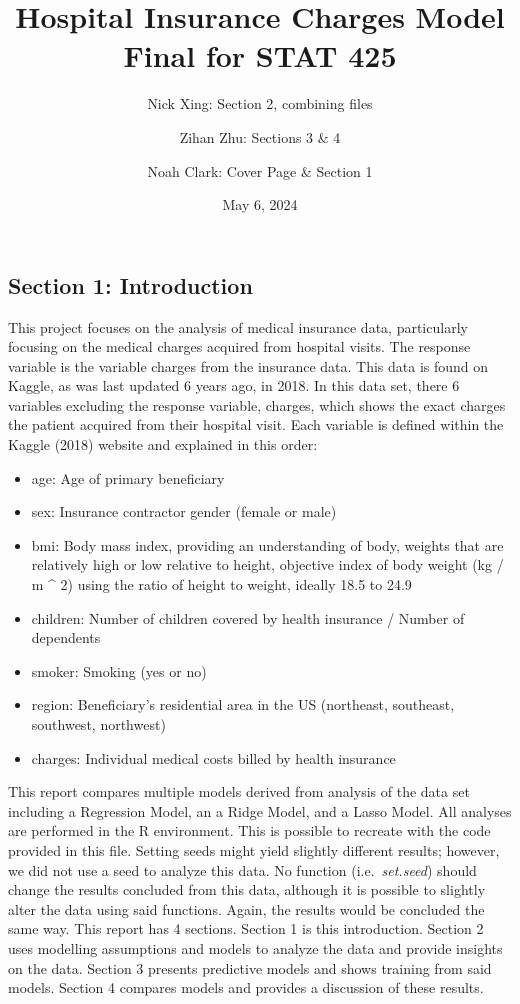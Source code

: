 \documentclass[
  12pt,
]{article}
\title{Hospital Insurance Charges Model \vspace{0.5cm}\\
Final for STAT 425}
\author{Nick Xing: Section 2, combining files \and Zihan Zhu: Sections 3
\& 4 \and Noah Clark: Cover Page \& Section 1}
\date{May 6, 2024}
\begin{document}
\maketitle

{
\setcounter{tocdepth}{3}
\tableofcontents
}
\newpage

\subsection{Section 1: Introduction}\label{section-1-introduction}

This project focuses on the analysis of medical insurance data,
particularly focusing on the medical charges acquired from hospital
visits. The response variable is the variable charges from the insurance
data. This data is found on Kaggle, as was last updated 6 years ago, in
2018. In this data set, there 6 variables excluding the response
variable, charges, which shows the exact charges the patient acquired
from their hospital visit. Each variable is defined within the Kaggle
(2018) website and explained in this order:

\begin{itemize}
\item
  age: Age of primary beneficiary
\item
  sex: Insurance contractor gender (female or male)
\item
  bmi: Body mass index, providing an understanding of body, weights that
  are relatively high or low relative to height, objective index of body
  weight (kg / m \^{} 2) using the ratio of height to weight, ideally
  18.5 to 24.9
\item
  children: Number of children covered by health insurance / Number of
  dependents
\item
  smoker: Smoking (yes or no)
\item
  region: Beneficiary's residential area in the US (northeast,
  southeast, southwest, northwest)
\item
  charges: Individual medical costs billed by health insurance
\end{itemize}

This report compares multiple models derived from analysis of the data
set including a Regression Model, an a Ridge Model, and a Lasso Model.
All analyses are performed in the R environment. This is possible to
recreate with the code provided in this file. Setting seeds might yield
slightly different results; however, we did not use a seed to analyze
this data. No function (i.e.~\emph{set.seed}) should change the results
concluded from this data, although it is possible to slightly alter the
data using said functions. Again, the results would be concluded the
same way. This report has 4 sections. Section 1 is this introduction.
Section 2 uses modelling assumptions and models to analyze the data and
provide insights on the data. Section 3 presents predictive models and
shows training from said models. Section 4 compares models and provides
a discussion of these results.
\end{document}
